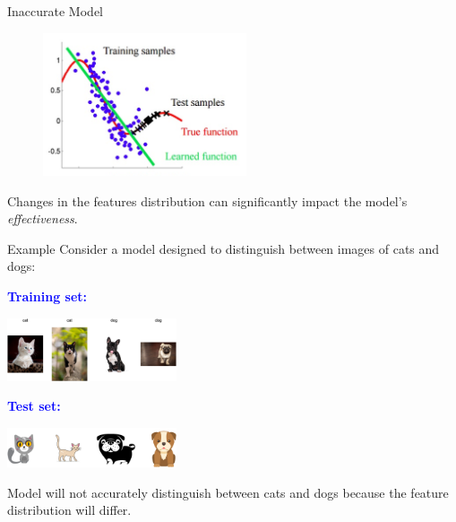 \begin{frame}{Inaccurate Model}
	\begin{figure}[H]
		\centering
		\includegraphics[width=6cm]{../assets/inacurate_model.png}
		\label{fig:inacurate_model}
	\end{figure}
	Changes in the features distribution can significantly impact the model's \textit{effectiveness}.
\end{frame}

\begin{frame}{Example}
	Consider a model designed to distinguish between images of cats and dogs:
	
	\vspace{0.5cm}
	\begin{minipage}[t]{0.55\textwidth} %
		\begin{flushleft}
			\textbf{\textcolor{blue}{Training set:}}
		\end{flushleft}
		\centering
		\includegraphics[width=5cm]{../assets/cat-dog-train.png}
		\label{fig:cani-gatti-train}
		\vspace{-0.2cm}
		\begin{flushleft}
			\textbf{\textcolor{blue}{Test set:}}
		\end{flushleft}
		\centering
		\includegraphics[width=5cm]{../assets/cat-dog-test.png}
		\label{fig:cani-gatti-test}
		
	\end{minipage}
	\hfill
	\begin{minipage}[t]{0.35\textwidth} %
		\vspace{0.2cm}
		\begin{tcolorbox}[colframe=blue!50!black, colback=blue!5, coltitle=black, sharp corners]
			Model will not accurately distinguish between cats and dogs because the feature distribution will differ.
		\end{tcolorbox}
	\end{minipage}
\end{frame}


%  